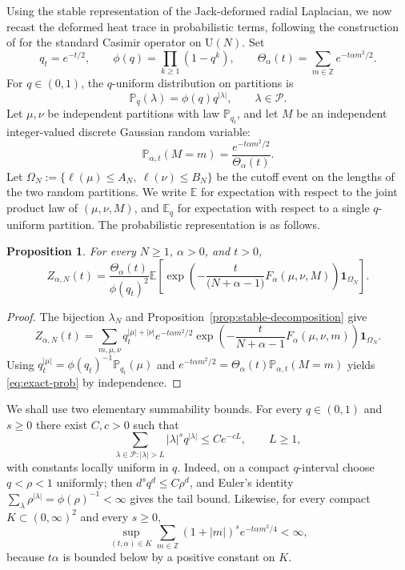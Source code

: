 \documentclass[11pt,a4paper,reqno]{article}
\newtheorem{proposition}[theorem]{Proposition}
\theoremstyle{definition}
\theoremstyle{remark}
\newcommand\U{{\mathrm U}}
\newcommand\Z{{\mathbb Z}}
\newcommand\E{{\mathbb E}}
\newcommand\Pbb{{\mathbb P}}
\newcommand\Pcal{{\mathcal P}}
\newcommand\one{{\mathbf 1}}
\newcommand\ellpart{{\ell}}
\begin{document}
Using the stable representation of the Jack-deformed radial Laplacian, we now recast the deformed heat trace in probabilistic terms, following the construction of \cite{LemMai25} for the standard Casimir operator on $\U(N)$.  Set
\[
q_t=e^{-t/2},\qquad \phi(q)=\prod_{k\geq1}(1-q^k),\qquad \Theta_\alpha(t)=\sum_{m\in\Z}e^{-t\alpha m^2/2}.
\]
For $q\in(0,1)$, the $q$-uniform distribution on partitions is
\begin{equation}\label{eq:q-uniform}
\Pbb_q(\lambda)=\phi(q)q^{|\lambda|},\qquad \lambda\in\Pcal.
\end{equation}
Let $\mu,\nu$ be independent partitions with law $\Pbb_{q_t}$, and let $M$ be an independent integer-valued discrete Gaussian random variable:
\begin{equation}\label{eq:discrete-Gaussian}
\Pbb_{\alpha,t}(M=m)=\frac{e^{-t\alpha m^2/2}}{\Theta_\alpha(t)}.
\end{equation}
Let $\Omega_N:=\{\ellpart(\mu)\leq A_N,\ \ellpart(\nu)\leq B_N\}$ be the cutoff event on the lengths of the two random partitions.  We write $\E$ for expectation with respect to the joint product law of $(\mu,\nu,M)$, and $\E_q$ for expectation with respect to a single $q$-uniform partition.  The probabilistic representation is as follows.

\begin{proposition}\label{prop:exact-prob}
For every $N\geq1$, $\alpha>0$, and $t>0$,
\begin{equation}\label{eq:exact-prob}
Z_{\alpha,N}(t) =\frac{\Theta_\alpha(t)}{\phi(q_t)^2} \E\left[ \exp\left(-\frac{t}{\bigl(N+\alpha-1\bigr)}F_\alpha(\mu,\nu,M)\right) \one_{\Omega_N} \right].
\end{equation}
\end{proposition}

\begin{proof}
The bijection $\lambda_N$ and Proposition~\ref{prop:stable-decomposition} give
\[
Z_{\alpha,N}(t) =\sum_{m,\mu,\nu} q_t^{|\mu|+|\nu|}e^{-t\alpha m^2/2} \exp\left(-\frac{t}{N+\alpha-1}F_\alpha(\mu,\nu,m)\right) \one_{\Omega_N}.
\]
Using $q_t^{|\mu|}=\phi(q_t)^{-1}\Pbb_{q_t}(\mu)$ and
$e^{-t\alpha m^2/2}=\Theta_\alpha(t)\Pbb_{\alpha,t}(M=m)$ yields \eqref{eq:exact-prob} by independence.
\end{proof}

We shall use two elementary summability bounds.  For every $q\in(0,1)$ and $s\geq0$ there exist $C,c>0$ such that
\begin{equation}\label{eq:q-tail}
\sum_{\lambda\in\Pcal:|\lambda|>L}|\lambda|^s q^{|\lambda|} \leq Ce^{-cL},\qquad L\geq1,
\end{equation}
with constants locally uniform in $q$.  Indeed, on a compact $q$-interval choose $q<\rho<1$ uniformly; then $d^s q^d\leq C\rho^d$, and Euler's identity
$\sum_{\lambda}\rho^{|\lambda|}=\phi(\rho)^{-1}<\infty$ gives the tail bound.  Likewise, for every compact $K\subset(0,\infty)^2$ and every $s\geq0$,
\begin{equation}\label{eq:gaussian-moments}
\sup_{(t,\alpha)\in K} \sum_{m\in\Z}(1+|m|)^s e^{-t\alpha m^2/4}<\infty,
\end{equation}
because $t\alpha$ is bounded below by a positive constant on $K$.
\end{document}
